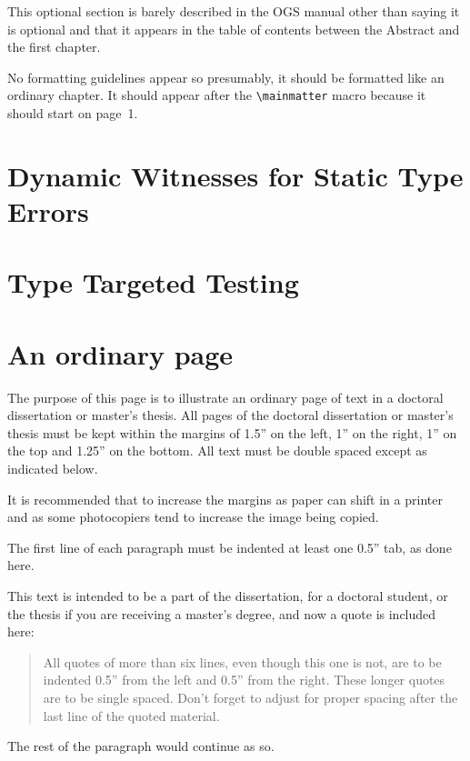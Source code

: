 \documentclass[12pt]{ucsddissertation}
\theoremstyle{plain}%
\theoremstyle{definition}
\begin{document}
\begin{dissertationintroduction}
This optional section is barely described in the OGS manual other than
saying it is optional and that it appears in the table of contents
between the Abstract and the first chapter.

No formatting guidelines appear so presumably, it should be formatted
like an ordinary chapter. It should appear after the
\verb!\mainmatter! macro because it should start on page~1.
\end{dissertationintroduction}


\chapter{Dynamic Witnesses for Static Type Errors}






\chapter{Type Targeted Testing}






\chapter{An ordinary page}
The purpose of this page is to illustrate an ordinary page of text in
a doctoral dissertation or master's thesis. All pages of the doctoral
dissertation or master's thesis must be kept within the margins of
1.5'' on the left, 1'' on the right, 1'' on the top and 1.25'' on the
bottom. All text must be double spaced except as indicated below.

It is recommended that to increase the margins as paper can shift in a
printer and as some photocopiers tend to increase the image being
copied.

The first line of each paragraph must be indented at least one 0.5''
tab, as done here.

This text is intended to be a part of the dissertation, for a doctoral
student, or the thesis if you are receiving a master's degree, and now
a quote is included here:
\begin{quote}
All quotes of more than six lines, even though this one is not, are to
be indented 0.5'' from the left and 0.5'' from the right. These longer
quotes are to be single spaced. Don't forget to adjust for proper
spacing after the last line of the quoted material.
\end{quote}
The rest of the paragraph would continue as so.
\end{document}
